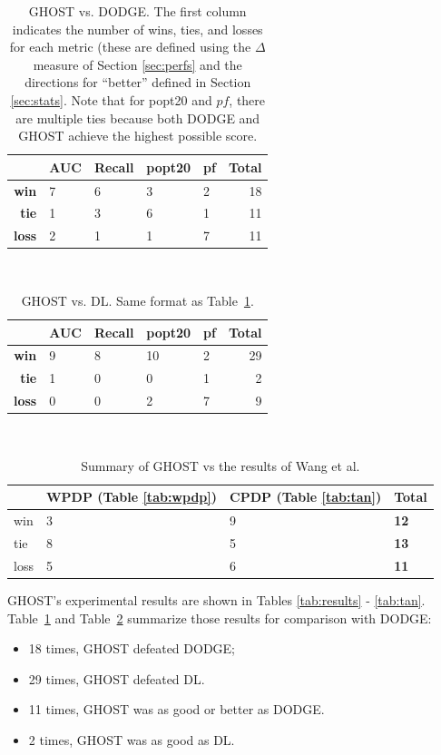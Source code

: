 \documentclass[10pt,compsoc,twocolumn]{IEEEtran}
\newcommand{\bi}{\begin{itemize}}
\newcommand{\ei}{\end{itemize}}
\begin{document}
\begin{table}[t!]
    \centering
    \caption{GHOST vs. DODGE. The first column indicates the number of wins, ties,  and losses  for each metric (these are defined using the $\Delta$ measure of Section \ref{sec:perfs} and the directions for ``better'' defined in Section \ref{sec:stats}.  Note that for popt20 and $pf$, there are multiple ties because both DODGE and GHOST achieve the highest possible score.}
  
  \scriptsize
   \begin{tabular}{rllll|r} 
    & AUC & Recall & popt20 & pf & Total \\
    \midrule
     \textbf{win} & 7 & 6 & 3 & 2 & 18 \\
    \textbf{tie} & 1 & 3 & 6 & 1 & 11 \\
     \textbf{loss} & 2 & 1 & 1 & 7 & 11 \\ 
    \end{tabular}
    \ 
    \label{tab:ghost_dodge}
\end{table}

\begin{table}[t!]
    \centering
    \caption{GHOST vs. DL. Same format as Table~\ref{tab:ghost_dodge}.}
    \scriptsize
   \begin{tabular}{rllll|r} 
    & AUC & Recall & popt20 & pf & Total \\
    \midrule
     \textbf{win} & 9 & 8 & 10 & 2 & 29 \\
     \textbf{tie} & 1 & 0 & 0 & 1 & 2 \\
     \textbf{loss} & 0 & 0 & 2 & 7 & 9 
    \end{tabular}
    \ 
    \label{tab:ghost_dl}
\end{table}

\begin{table}[h]
    \centering
    \caption{Summary of GHOST vs the results of Wang et al. \cite{wang2016automatically}}
    \label{tab:tan-summary}
    \begin{tabular}{l|ll|l}
    \toprule 
         & \textbf{WPDP (Table \ref{tab:wpdp})} & \textbf{CPDP (Table \ref{tab:tan})} & \textbf{Total} \\
         \midrule 
       win  & 3 & 9 & \textbf{12} \\
       tie  & 8 & 5 & \textbf{13} \\
       loss & 5 & 6 & \textbf{11}
    \end{tabular}
\end{table}

GHOST's  experimental results are shown in  Tables \ref{tab:results} - \ref{tab:tan}.
Table~\ref{tab:ghost_dodge} and Table~\ref{tab:ghost_dl} summarize those results for comparison with DODGE:
\bi
\item
   18 times, GHOST defeated DODGE;
\item
  29 times, GHOST defeated   DL.\item
  11 times, GHOST was as good or better as DODGE.
  \item
   2 times, GHOST was as good as   DL.
\ei
\end{document}
